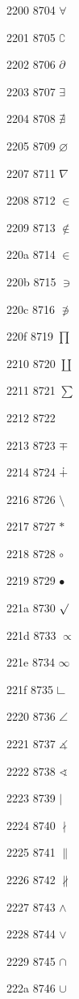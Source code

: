 \documentclass[11pt]{article}
\begin{document}
2200 8704 \ensuremath{\forall}

2201 8705 \ensuremath{\complement}

2202 8706 \ensuremath{\partial}

2203 8707 \ensuremath{\exists}

2204 8708 \ensuremath{\nexists}

2205 8709 \ensuremath{\varnothing}

2207 8711 \ensuremath{\nabla}

2208 8712 \ensuremath{\in}

2209 8713 \ensuremath{\notin}

220a 8714 \ensuremath{\in}

220b 8715 \ensuremath{\ni}

220c 8716 \ensuremath{\not\ni}

220f 8719 \ensuremath{\prod}

2210 8720 \ensuremath{\coprod}

2211 8721 \ensuremath{\sum}

2212 8722 \minus

2213 8723 \ensuremath{\mp}

2214 8724 \ensuremath{\dotplus}

2216 8726 \ensuremath{\setminus}

2217 8727 \ensuremath{\ast}

2218 8728 \ensuremath{\circ}

2219 8729 \ensuremath{\bullet}

221a 8730 \ensuremath{\surd}

221d 8733 \ensuremath{\propto}

221e 8734 \ensuremath{\infty}

221f 8735 \ensuremath{\rightangle}

2220 8736 \ensuremath{\angle}

2221 8737 \ensuremath{\measuredangle}

2222 8738 \ensuremath{\sphericalangle}

2223 8739 \ensuremath{\mid}

2224 8740 \ensuremath{\nmid}

2225 8741 \ensuremath{\parallel}

2226 8742 \ensuremath{\nparallel}

2227 8743 \ensuremath{\wedge}

2228 8744 \ensuremath{\vee}

2229 8745 \ensuremath{\cap}

222a 8746 \ensuremath{\cup}
\end{document}
